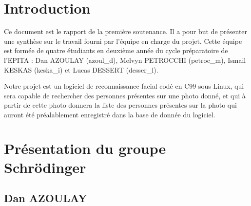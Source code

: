 \documentclass[12pt,a4paper]{article}
\begin{document}
\newpage
\tableofcontents

\newpage


\section*{Introduction}
Ce document est le rapport de la première soutenance. Il a pour but de présenter une synthèse sur le travail fourni par l'équipe en charge du projet. Cette équipe est formée de quatre étudiants en deuxième année du cycle préparatoire de l'EPITA : Dan AZOULAY (azoul\_d), Melvyn PETROCCHI (petroc\_m), Ismail KESKAS (keska\_i) et Lucas DESSERT (desser\_l).

 Notre projet est un logiciel de reconnaissance facial codé en C99 sous Linux, qui sera capable de rechercher des personnes présentes sur une photo donné, et qui à partir de cette photo donnera la liste des personnes présentes sur la photo qui auront été préalablement enregistré dans la base de donnée du logiciel.



\newpage


 \section{Présentation du groupe Schrödinger} 
 


\subsection{Dan AZOULAY}
\end{document}
